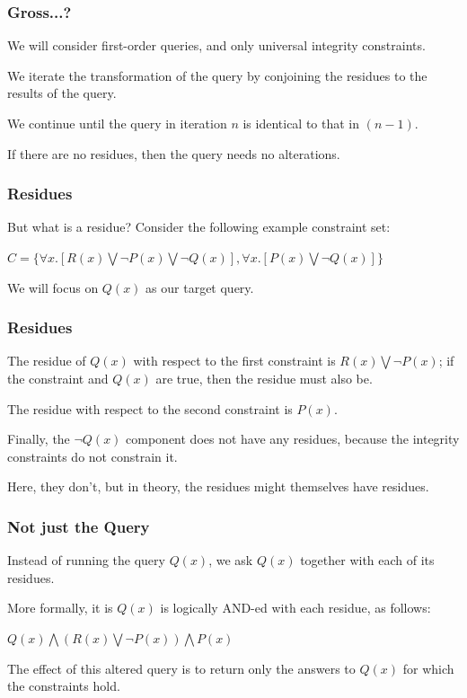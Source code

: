 \begin{frame}
\frametitle{Gross...?}

We will consider first-order queries, and only universal integrity constraints. 

We iterate the transformation of the query by conjoining the \alert{residues} to the results of the query. 

We continue until the query in iteration $n$ is identical to that in $(n-1)$.

If there are no residues, then the query needs no alterations.


\end{frame}

\begin{frame}
\frametitle{Residues}

But what is a residue? Consider the following example constraint set:
\begin{center}
$C = \{\forall x.[R(x) \bigvee \neg P(x) \bigvee \neg Q(x)], \forall x.[P(x) \bigvee \neg Q(x)] \}$ 
\end{center}

We will focus on $Q(x)$ as our target query. 

\end{frame}

\begin{frame}
\frametitle{Residues}

The residue of $Q(x)$ with respect to the first constraint is $R(x) \bigvee \neg P(x)$; if the constraint and $Q(x)$ are true, then the residue must also be. 

The residue with respect to the second constraint is $P(x)$. 

Finally, the $\neg Q(x)$ component does not have any residues, because the integrity constraints do not constrain it. 

Here, they don't, but in theory, the residues might themselves have residues.

\end{frame}

\begin{frame}
\frametitle{Not just the Query}

Instead of running the query $Q(x)$, we ask $Q(x)$ together with each of its residues. 

More formally, it is $Q(x)$ is logically AND-ed with each residue, as follows:

\begin{center}
$Q(x) \bigwedge (R(x) \bigvee \neg P(x)) \bigwedge P(x)$
\end{center}

The effect of this altered query is to return only the answers to $Q(x)$ for which the constraints hold.

\end{frame}


